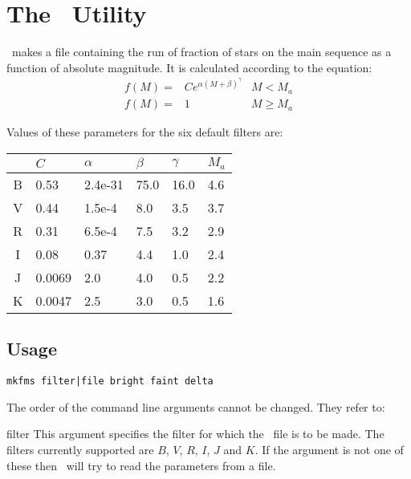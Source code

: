 \documentclass[11pt,twoside]{article}
\begin{document}
\newpage
\section{The \mkfms\ Utility}

\mkfms\ makes a file containing the run of fraction of stars on the main
sequence as a function of absolute magnitude. It is calculated according
to the equation:
\[
\begin{array}{lll}
f(M) = & C e^{\alpha(M+\beta)^{\gamma}} & M < M_a \\
f(M) = & 1 & M \geq M_a
\end{array}
\]

Values of these parameters for the six default filters are:

\begin{table}[h]
\centering
\begin{tabular}{clllll}
  & $C$    & $\alpha$ & $\beta$ & $\gamma$ & $M_a$ \\ \hline
B & 0.53   & 2.4e-31  & 75.0    & 16.0     & 4.6 \\
V & 0.44   & 1.5e-4   & 8.0     & 3.5      & 3.7 \\
R & 0.31   & 6.5e-4   & 7.5     & 3.2      & 2.9 \\
I & 0.08   & 0.37     & 4.4     & 1.0      & 2.4 \\
J & 0.0069 & 2.0      & 4.0     & 0.5      & 2.2 \\
K & 0.0047 & 2.5      & 3.0     & 0.5      & 1.6 \\ \hline
\end{tabular}
\end{table}

\subsection*{Usage}

\begin{verbatim}
mkfms filter|file bright faint delta
\end{verbatim}

\nin
The order of the command line arguments cannot be changed. They refer to:
\medskip

\begin{clo}{filter}
This argument specifies the filter for which the \fms\
file is to be made. The filters currently supported are $B$, $V$, $R$, $I$, $J$
and $K$. If the argument is not one of these then \mkfms\ will try to read the
parameters from a file.
\end{clo}
\end{document}
